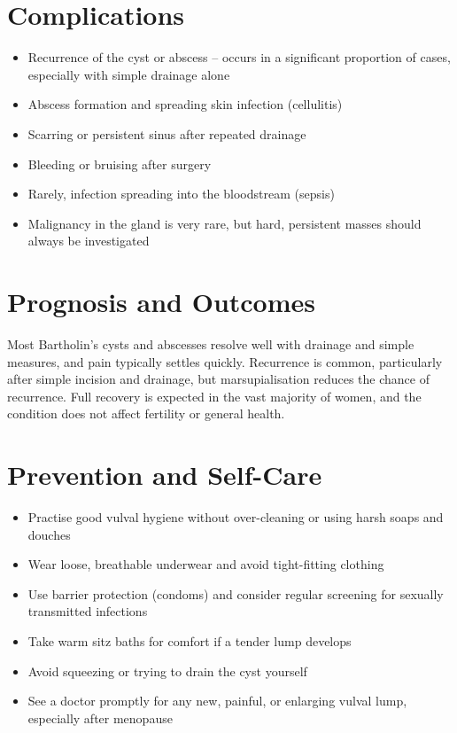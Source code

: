 \section*{Complications}
\begin{itemize}
    \item Recurrence of the cyst or abscess -- occurs in a significant proportion of cases, especially with simple drainage alone
    \item Abscess formation and spreading skin infection (cellulitis)
    \item Scarring or persistent sinus after repeated drainage
    \item Bleeding or bruising after surgery
    \item Rarely, infection spreading into the bloodstream (sepsis)
    \item Malignancy in the gland is very rare, but hard, persistent masses should always be investigated
\end{itemize}

\section*{Prognosis and Outcomes}
Most Bartholin's cysts and abscesses resolve well with drainage and simple measures, and pain typically settles quickly. Recurrence is common, particularly after simple incision and drainage, but marsupialisation reduces the chance of recurrence. Full recovery is expected in the vast majority of women, and the condition does not affect fertility or general health.

\section*{Prevention and Self-Care}
\begin{itemize}
    \item Practise good vulval hygiene without over-cleaning or using harsh soaps and douches
    \item Wear loose, breathable underwear and avoid tight-fitting clothing
    \item Use barrier protection (condoms) and consider regular screening for sexually transmitted infections
    \item Take warm sitz baths for comfort if a tender lump develops
    \item Avoid squeezing or trying to drain the cyst yourself
    \item See a doctor promptly for any new, painful, or enlarging vulval lump, especially after menopause
\end{itemize}

